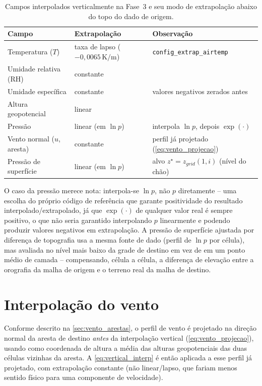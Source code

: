 \begin{table}[H]
  \centering
  \caption{Campos interpolados verticalmente na Fase~3 e seu modo de
    extrapolação abaixo do topo do dado de origem.}
  \label{tab:campos_fase3}
  \begin{tabular}{@{}lll@{}}
    \toprule
    Campo & Extrapolação & Observação \\
    \midrule
    Temperatura ($T$) & taxa de lapso ($-0{,}0065\,\si{\kelvin\per\metre}$) & \texttt{config\_extrap\_airtemp} \\
    Umidade relativa (RH) & constante & \\
    Umidade específica & constante & valores negativos zerados antes \\
    Altura geopotencial & linear & \\
    Pressão & linear (em $\ln p$) & interpola $\ln p$, depois $\exp(\cdot)$ \\
    Vento normal ($u$, aresta) & constante & perfil já projetado (\cref{eq:vento_projecao}) \\
    Pressão de superfície & linear (em $\ln p$) & alvo $z^\star = z_{grid}(1,i)$ (nível do chão) \\
    \bottomrule
  \end{tabular}
\end{table}

O caso da pressão merece nota: interpola-se $\ln p$, não $p$ diretamente
-- uma escolha do próprio código de referência que garante positividade
do resultado interpolado/extrapolado, já que $\exp(\cdot)$ de qualquer
valor real é sempre positivo, o que não seria garantido interpolando $p$
linearmente e podendo produzir valores negativos em extrapolação. A
pressão de superfície ajustada por diferença de topografia usa a mesma
fonte de dado (perfil de $\ln p$ por célula), mas avaliada no nível mais
baixo da grade de destino em vez de em um ponto médio de camada --
compensando, célula a célula, a diferença de elevação entre a orografia
da malha de origem e o terreno real da malha de destino.

\section{Interpolação do vento}

Conforme descrito na \cref{sec:vento_arestas}, o perfil de vento é
projetado na direção normal da aresta de destino \emph{antes} da
interpolação vertical (\cref{eq:vento_projecao}), usando como coordenada
de altura a média das alturas geopotenciais das duas células vizinhas da
aresta. A \cref{eq:vertical_interp} é então aplicada a esse perfil já
projetado, com extrapolação constante (não linear/lapso, que fariam
menos sentido físico para uma componente de velocidade).
